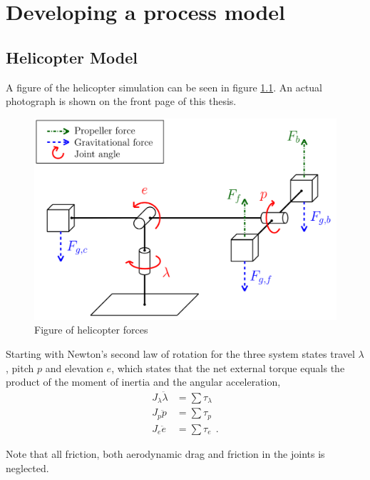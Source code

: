 
\chapter{Developing a process model}


\section{Helicopter Model}\label{sec:helicopter}

A figure of the helicopter simulation can be seen in figure \ref{fig:heli_1}. An actual photograph is shown on the front page of this thesis.

\begin{figure}
    \centering
    \includegraphics[scale=0.5]{fig/heli_fig_1.png}
    \caption{Figure of helicopter forces}
    \label{fig:heli_1}
\end{figure}

Starting with Newton's second law of rotation for the three system states travel $\lambda$, pitch $p$ and elevation $e$, which states that the net external torque equals the product of the moment of inertia and the angular acceleration,
\begin{equation}
    \begin{split}
        J_{\lambda} \ddot{\lambda} &= \sum{\tau_{\lambda}} \\
        J_p \ddot{p} &= \sum{\tau_p} \\
        J_e \ddot{e} &= \sum{\tau_e} \: \: .
    \end{split}
\end{equation}

Note that all friction, both aerodynamic drag and friction in the joints is neglected.

